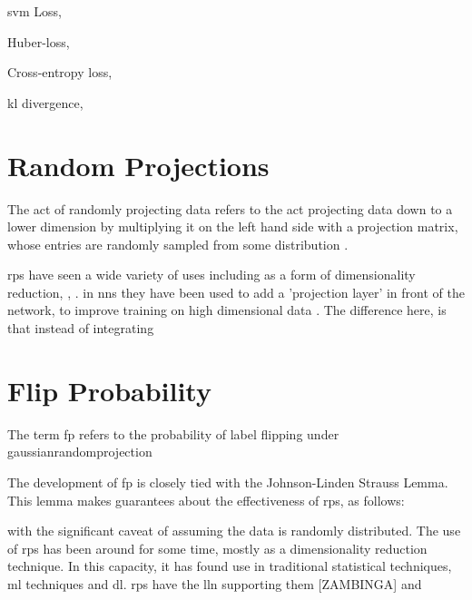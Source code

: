 \gls{svm} Loss,

Huber-loss,

Cross-entropy loss,

\gls{kl} divergence,

\section{Random Projections}

The act of randomly projecting data refers to the act projecting data down to a lower dimension by multiplying it on the left hand side with a projection matrix, whose entries are randomly sampled from some distribution \cite{bob_learning_high_dim}.



\gls{rp}s have seen a wide variety of uses \cite{random_project_uses} including as a form of dimensionality reduction, %
, . in \gls{nn}s they have been used to add a 'projection layer' in front of the network, to improve training on high dimensional data \cite{random_project_high_d}. The difference here, is that instead of integrating 

\section{Flip Probability}

The term \gls{fp} refers to the probability of label flipping under \gls{gaussianrandomprojection} \cite{bob_sharp_generalisation_error_bounds}

The development of \gls{fp} is closely tied with the Johnson-Linden Strauss Lemma. This lemma makes guarantees about the effectiveness of \gls{rp}s, as follows:



with the significant caveat of assuming the data is randomly distributed. The use of \gls{rp}s has been around for some time, mostly as a dimensionality reduction technique. In this capacity, it has found use in traditional statistical techniques, \gls{ml} techniques and \gls{dl}. \gls{rp}s have the \gls{lln} supporting them [ZAMBINGA] and 

